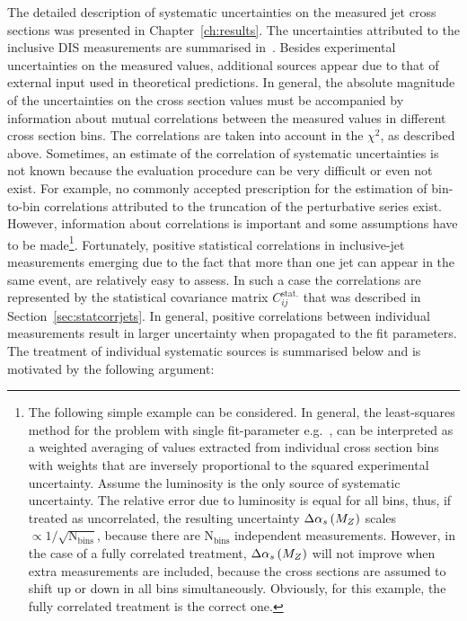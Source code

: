 The detailed description of systematic uncertainties on the measured jet cross sections was presented in Chapter~\ref{ch:results}. The uncertainties attributed to the inclusive DIS measurements are summarised in~\cite{Aaron:2009aa}. Besides experimental uncertainties on the measured values, additional sources appear due to that of external input used in theoretical predictions. In general, the absolute magnitude of the uncertainties on the cross section values must be accompanied by information about mutual correlations between the measured values in different cross section bins. The correlations are taken into account in the $\chi^2$, as described above. Sometimes, an estimate of the correlation of systematic uncertainties is not known because the evaluation procedure can be very difficult or even not exist. For example, no commonly accepted prescription for the estimation of bin-to-bin correlations attributed to the truncation of the perturbative series exist. However, information about correlations is important and some assumptions have to be made\footnote{The following simple example can be considered. In general, the least-squares method for the problem with single fit-parameter e.g.~\asz, can be interpreted as a weighted averaging of \asz values extracted from individual cross section bins with weights that are inversely proportional to the squared experimental uncertainty. Assume the luminosity is the only source of systematic uncertainty. The relative error due to luminosity is equal for all bins, thus, if treated as uncorrelated, the resulting uncertainty $\Delta\mbox{$\alpha_{s}\left(M_{Z}\right)$}$ scales $\propto 1/\sqrt{\text{N}_\text{bins}}$, because there are $\text{N}_\text{bins}$ independent \asz measurements. However, in the case of a fully correlated treatment, $\Delta\mbox{$\alpha_{s}\left(M_{Z}\right)$}$ will not improve when extra measurements are included, because the cross sections are assumed to shift up or down in all bins simultaneously. Obviously, for this example, the fully correlated treatment is the correct one.}. Fortunately, positive statistical correlations in inclusive-jet measurements emerging due to the fact that more than one jet can appear in the same event, are relatively easy to assess. In such a case the correlations are represented by the statistical covariance matrix $C_{ij}^{\text{stat.}}$ that was described in Section~\ref{sec:statcorrjets}. In general, positive correlations between individual measurements result in larger uncertainty when propagated to the fit parameters. The treatment of individual systematic sources is summarised below and is motivated by the following argument: 
